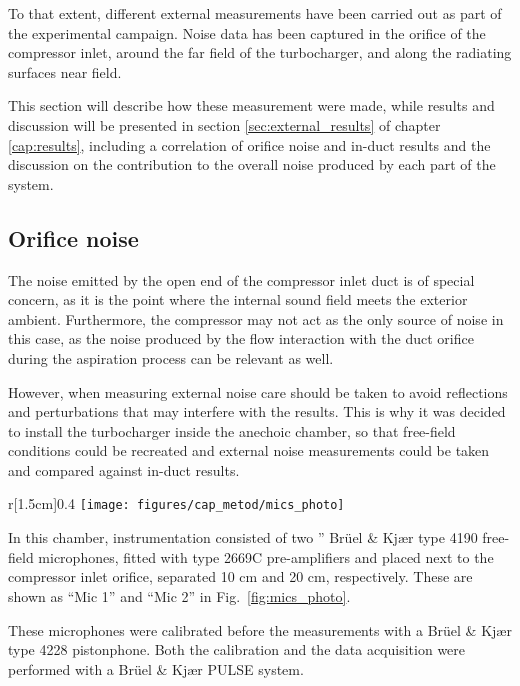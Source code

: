 To that extent, different external measurements have been carried out as part of the experimental campaign. Noise data has been captured in the orifice of the compressor inlet, around the far field of the turbocharger, and along the radiating surfaces near field.

This section will describe how these measurement were made, while results and discussion will be presented in section \ref{sec:external_results} of chapter \ref{cap:results}, including a correlation of orifice noise and in-duct results and the discussion on the contribution to the overall noise produced by each part of the system.

\subsection{Orifice noise}
\label{sub:metod_orifice_noise}

The noise emitted by the open end of the compressor inlet duct is of special concern, as it is the point where the internal sound field meets the exterior ambient. Furthermore, the compressor may not act as the only source of noise in this case, as the noise produced by the flow interaction with the duct orifice during the aspiration process can be relevant as well.

However, when measuring external noise care should be taken to avoid reflections and perturbations that may interfere with the results. This is why it was decided to install the turbocharger inside the anechoic chamber, so that free-field conditions could be recreated and external noise measurements could be taken and compared against in-duct results.

\begin{wrapfigure}[22]{r}[1.5cm]{0.4\textwidth}
\centering
\vspace{6mm}
\texttt{[image: figures/cap\_metod/mics\_photo]}
\caption{Image of the two free-field microphones placed at 10 mm (Mic 1) and 20 mm (Mic 2) from the orifice of the compressor inlet duct.}
\label{fig:mics_photo}
\end{wrapfigure}

In this chamber, instrumentation consisted of two '' Brüel \& Kjær type 4190 free-field microphones, fitted with type 2669C pre-amplifiers and placed next to the compressor inlet orifice, separated 10 cm and 20 cm, respectively. These are shown as ``Mic 1'' and ``Mic 2'' in Fig.~\ref{fig:mics_photo}.

These microphones were calibrated before the measurements with a Brüel \& Kjær type 4228 pistonphone. Both the calibration and the data acquisition were performed with a Brüel \& Kjær PULSE system.


